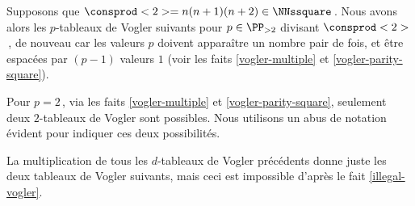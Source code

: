 \leavevmode
\smallskip

Supposons que $\consprod<2> = n(n+1)(n+2) \in \NNssquare$\,. Nous avons alors les $p$-tableaux de Vogler suivants pour $p \in \PP_{>2}$ divisant $\consprod<2>$\,, de nouveau car les valeurs $p$ doivent apparaître un nombre pair de fois, et être espacées par $(p-1)$ valeurs $1$ (voir les faits \ref{vogler-multiple} et \ref{vogler-parity-square}).

\begin{center}
\end{center}


Pour $p = 2$\,, via les faits \ref{vogler-multiple} et \ref{vogler-parity-square}, seulement deux $2$-tableaux de Vogler sont possibles. Nous utilisons un abus de notation évident pour indiquer ces deux possibilités.

\begin{center}
\end{center}


La multiplication de tous les $d$-tableaux de Vogler précédents donne juste les deux tableaux de Vogler suivants, mais ceci est impossible d'après le fait \ref{illegal-vogler}.

\begin{center}
\end{center}